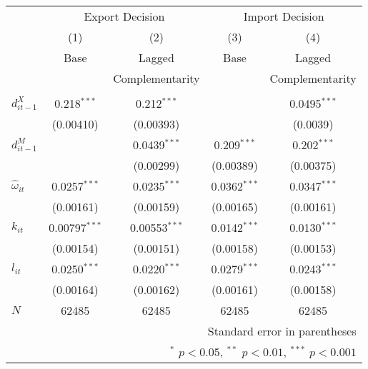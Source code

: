 \begin{center}
\begin{tabular}{l*{4}{c}}
\hline\hline&\multicolumn{2}{c}{Export
              Decision}&\multicolumn{2}{c}{Import Decision}\\
            &\multicolumn{1}{c}{(1)}&\multicolumn{1}{c}{(2)}&\multicolumn{1}{c}{(3)}&\multicolumn{1}{c}{(4)}\\
            &\multicolumn{1}{c}{Base}&\multicolumn{1}{c}{Lagged}&\multicolumn{1}{c}{Base}&\multicolumn{1}{c}{Lagged}\\
&\multicolumn{1}{c}{}&\multicolumn{1}{c}{Complementarity}&\multicolumn{1}{c}{}&\multicolumn{1}{c}{Complementarity}\\
\hline
\\
$d_{it-1}^{X}$&       0.218$^{***}$&       0.212$^{***}$&                     &      0.0495$^{***}$\\
            &   (0.00410)         &   (0.00393)         & & (0.0039)\\
$d_{it-1}^{M}$   &                  &      0.0439$^{***}$&       0.209$^{***}$&       0.202$^{***}$\\
            &                     &   (0.00299)         &   (0.00389)         &   (0.00375)         \\
                                   

$\hat{\omega}_{it}$            &      0.0257$^{***}$&      0.0235$^{***}$&      0.0362$^{***}$&      0.0347$^{***}$\\
               & (0.00161)         &   (0.00159)         &   (0.00165)         &   (0.00161)         \\
     
$k_{it}$            &     0.00797$^{***}$&     0.00553$^{***}$&      0.0142$^{***}$&      0.0130$^{***}$\\
    &            (0.00154)         &   (0.00151)         &   (0.00158)         &   (0.00153)         \\
     
$l_{it}$            &      0.0250$^{***}$&      0.0220$^{***}$&      0.0279$^{***}$&      0.0243$^{***}$\\
   &(0.00164)         &   (0.00162)         &   (0.00161)         &   (0.00158)         \\
\hline
\(N\)       &       62485         &       62485         &       62485         &       62485         \\
\hline\hline
\multicolumn{5}{r}{\footnotesize Standard error in parentheses}\\
\multicolumn{5}{r}{\footnotesize $^{*}$ \(p<0.05\), $^{**}$ \(p<0.01\), $^{***}$ \(p<0.001\)}\\
\end{tabular}
\end{center}
